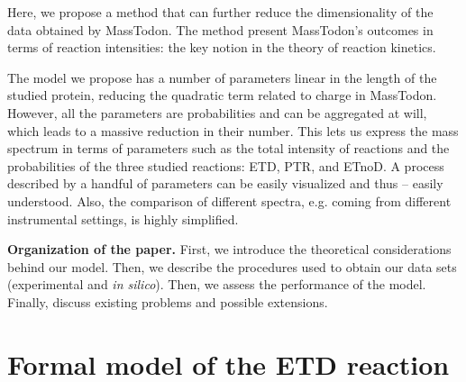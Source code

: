 \documentclass{llncs}
\begin{document}
Here, we propose a method that can further reduce the dimensionality of the data obtained by {\sc MassTodon}.
The method present {\sc MassTodon}'s outcomes in terms of reaction intensities: the key notion in the theory of reaction kinetics.

The model we propose has a number of parameters linear in the length of the studied protein, reducing the quadratic term related to charge in {\sc MassTodon}. However, all the parameters are probabilities and can be aggregated at will, which leads to a massive reduction in their number. This lets us express the mass spectrum in terms of parameters such as the total intensity of reactions and the probabilities of the three studied reactions: ETD, PTR, and ETnoD. A process described by a handful of parameters can be easily visualized and thus -- easily understood. Also, the comparison of different spectra, e.g. coming from different instrumental settings, is highly simplified.

\textbf{Organization of the paper.}
First, we introduce the theoretical considerations behind our model. Then, we describe the procedures used to obtain our data sets (experimental and \textit{in silico}). Then, we assess the performance of the model. Finally, discuss existing problems and possible extensions.


\section{Formal model of the ETD reaction}
\end{document}
